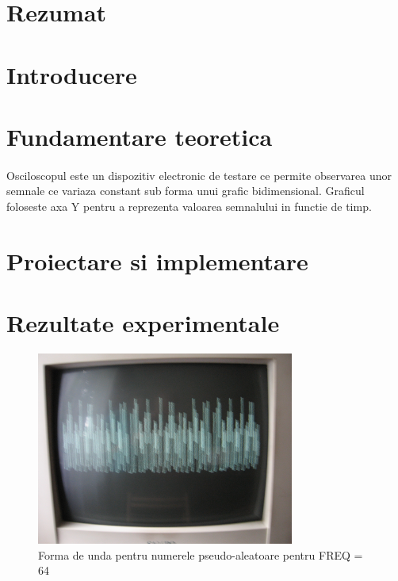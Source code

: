 \documentclass[10pt,a4paper]{article}
\begin{document}




\tableofcontents

\clearpage

\section{Rezumat}

\clearpage

\section{Introducere}

\clearpage

\section{Fundamentare teoretica}
\paragraph{}
Osciloscopul este un dispozitiv electronic de testare ce permite 
observarea unor semnale ce variaza constant sub forma unui grafic bidimensional.
Graficul foloseste axa Y pentru a reprezenta valoarea semnalului in functie de timp.


\clearpage

\section{Proiectare si implementare}

\clearpage



\clearpage

\section{Rezultate experimentale}
\begin{figure}[h]
\centering
\includegraphics[width=240pt]{waveform1}
\caption{Forma de unda pentru numerele pseudo-aleatoare pentru FREQ = 64}
\label{fig:waveform1}
\end{figure}
\end{document}
